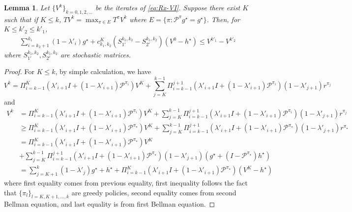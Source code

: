 \documentclass{article} %
\newcommand{\cP}{\mathcal{P}}
\newtheorem{lemma}{Lemma}
\begin{document}
\begin{lemma}\label{lem::KM_lower_bd}
Let $\{V^k\}_{k=0, 1,2,\dots}$ be the iterates of \ref{eq:Rx-VI}. Suppose there exist $K$ such that if $K \le k$,
 $TV^k=\max_{\pi \in E}T^{\pi}V^k $ where $E = \{\pi: \cP^{\pi}g^{\star}= g^{\star}\}$. Then, for $ K \le k'_2 \le k'_1$,
       \begin{align*}
      \sum^{k_1}_{i=k_2+1} (1-\lambda'_{i})g^{\star}+c^K_{k_1, k_2}(S^{k_1,k_2}_{1'}-S^{k_1,k_2}_{2'})(V^{0}-h^{\star}) \le V^{k'_1}-V^{k'_2}
    \end{align*}
where $S^{k_1,k_2}_{1'},S^{k_1,k_2}_{2'}$ are stochastic matrices.
\end{lemma}
\begin{proof}
 For $K \le k$, by simple calculation, we have
 \[V^k= \Pi^{K}_{i=k-1}(\lambda'_{i+1}I+(1-\lambda'_{i+1}) \cP^{\pi_i}) V^{K}+ \sum^{k-1}_{j=K}\Pi_{i=k-1}^{j+1}(\lambda'_{i+1}I+(1-\lambda'_{i+1}) \cP^{\pi_i})(1-\lambda'_{j+1}) r^{\pi_j}\]
 and 
 \begin{align*}
     V^k &= \Pi^{K}_{i=k-1}(\lambda'_{i+1}I+(1-\lambda'_{i+1}) \cP^{\pi_i}) V^{K}+ \sum^{k-1}_{j=K}\Pi_{i=k-1}^{j+1}(\lambda'_{i+1}I+(1-\lambda'_{i+1}) \cP^{\pi_i})(1-\lambda'_{j+1}) r^{\pi_j} 
     \\& \ge \Pi^{K}_{i=k-1}(\lambda'_{i+1}I+(1-\lambda'_{i+1}) \cP^{\pi_{\star}}) V^K + \sum^{k-1}_{j=K}\Pi_{i=k-1}^{j+1}(\lambda'_{i+1}I+(1-\lambda'_{i+1}) \cP^{\pi_{\star}})(1-\lambda'_{j+1}) r^{\pi_{\star}}
     \\& = \Pi^{K}_{i=k-1}(\lambda'_{i+1}I+(1-\lambda'_{i+1}) \cP^{\pi_{\star}}) V^K 
     \\&+ \sum^{k-1}_{j=K}\Pi_{i=k-1}^{j+1}(\lambda'_{i+1}I+(1-\lambda'_{i+1}) \cP^{\pi_{\star}})(1-\lambda'_{j+1}) (g^{\star}+(I-\cP^{\pi_{\star}})h^{\star})
      \\& =  \sum^{k}_{j=K+1}(1-\lambda'_j)g^{\star}+h^{\star} +\Pi_{i=k-1}^{K}(\lambda'_{i+1}I+(1-\lambda'_{i+1}) \cP^{\pi_{\star}})(V^K-h^{\star})
 \end{align*}
 where first equality comes from previous equality, first inequality follows the fact that $\{\pi_l\}_{l=K,K+1,\dots,k}$ are greedy policies, second equality comes from second Bellman equation, and last equality is from first Bellman equation.


\end{proof}
\end{document}
